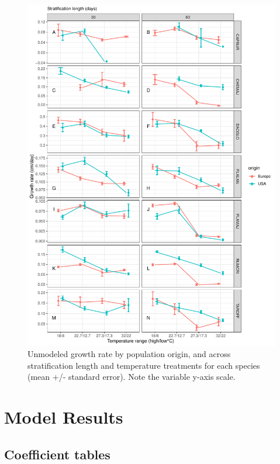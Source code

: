 \documentclass[12pt]{article}\usepackage[]{graphicx}\usepackage[]{color}
\begin{document}
\begin{figure}[H]
  \centering
  \includegraphics[scale=.8]{figure9} %
  \caption{Unmodeled growth rate by population origin, and across stratification length and temperature treatments for each   species (mean +/- standard error). Note the variable y-axis scale.} \label{fig:rawgrowth} 
\end{figure}

\section{Model Results}
\subsection{Coefficient tables}
\end{document}
